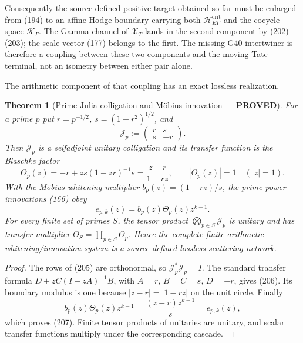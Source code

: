 \documentclass[11pt]{article}
\newtheorem{theorem}{Theorem}
\newcommand{\PROVED}{\textcolor{green!45!black}{\textbf{PROVED}}}
\begin{document}
Consequently the source-defined positive target obtained so far must be
enlarged from (194) to an affine Hodge boundary carrying both
$\mathscr H_{E\Gamma}^{\mathrm{crit}}$ and the cocycle space
$\mathscr K_\Gamma$.  The Gamma channel of $\mathcal X_T$ lands in the
second component by (202)--(203); the scale vector (177) belongs to the first.
The missing G40 intertwiner is therefore a coupling between these two
components and the moving Tate terminal, not an isometry between either pair
alone.

The arithmetic component of that coupling has an exact lossless realization.

\begin{theorem}[Prime Julia colligation and M\"obius innovation --- \PROVED]
For a prime $p$ put $r=p^{-1/2}$, $s=(1-r^2)^{1/2}$, and
\begin{equation}
 \mathcal J_p:=
 \begin{pmatrix}r&s\\s&-r\end{pmatrix}.              \tag{205}
\end{equation}
Then $\mathcal J_p$ is a selfadjoint unitary colligation and its transfer
function is the Blaschke factor
\begin{equation}
 \Theta_p(z)=-r+zs(1-zr)^{-1}s
 =\frac{z-r}{1-rz},\qquad |\Theta_p(z)|=1\quad(|z|=1). \tag{206}
\end{equation}
With the M\"obius whitening multiplier
$b_p(z)=(1-rz)/s$, the prime-power innovations (166) obey
\begin{equation}
 e_{p,k}(z)=b_p(z)\Theta_p(z)z^{k-1}.                 \tag{207}
\end{equation}
For every finite set of primes $S$, the tensor product
$\bigotimes_{p\in S}\mathcal J_p$ is unitary and has transfer multiplier
$\Theta_S=\prod_{p\in S}\Theta_p$.  Hence the complete finite arithmetic
whitening/innovation system is a source-defined lossless scattering network.
\end{theorem}

\begin{proof}
The rows of (205) are orthonormal, so $\mathcal J_p^*\mathcal J_p=I$.
The standard transfer formula $D+zC(I-zA)^{-1}B$, with
$A=r$, $B=C=s$, $D=-r$, gives (206).  Its boundary modulus is one because
$|z-r|=|1-rz|$ on the unit circle.  Finally
\[
 b_p(z)\Theta_p(z)z^{k-1}
 =\frac{(z-r)z^{k-1}}s=e_{p,k}(z),
\]
which proves (207).  Finite tensor products of unitaries are unitary, and
scalar transfer functions multiply under the corresponding cascade.
\end{proof}
\end{document}
